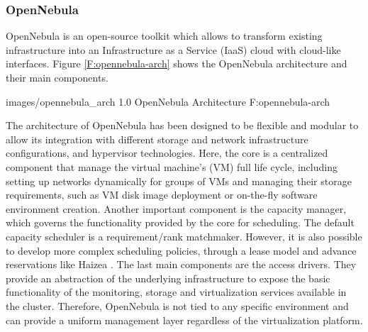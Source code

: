 
\subsubsection{OpenNebula}

OpenNebula \cite{www/opennebula, llorentecloud} is an open-source toolkit which allows to transform existing infrastructure into an Infrastructure as a Service (IaaS) cloud with cloud-like interfaces. Figure \ref{F:opennebula-arch} shows the OpenNebula architecture and their main components.

  {images/opennebula_arch}
  {1.0}
  {OpenNebula Architecture}
  {F:opennebula-arch}

The architecture of OpenNebula has been designed to be flexible and modular to allow its integration with different storage and network infrastructure configurations, and hypervisor technologies. Here, the core is a centralized component that manage the virtual machine's (VM) full life cycle, including setting up networks dynamically for groups of VMs and managing their storage requirements, such as VM disk image deployment or on-the-fly software environment creation. Another important component is the capacity manager, which governs the functionality provided by the core for scheduling. The default capacity scheduler is a requirement/rank matchmaker. However, it is also possible to develop more complex scheduling policies, through a lease model and advance reservations like Haizea \cite{haizea}. The last main components are the access drivers. They provide an abstraction of the underlying infrastructure to expose the basic functionality of the monitoring, storage and virtualization services available in the cluster. Therefore, OpenNebula is not tied to any specific environment and can provide a uniform management layer regardless of the virtualization platform.

